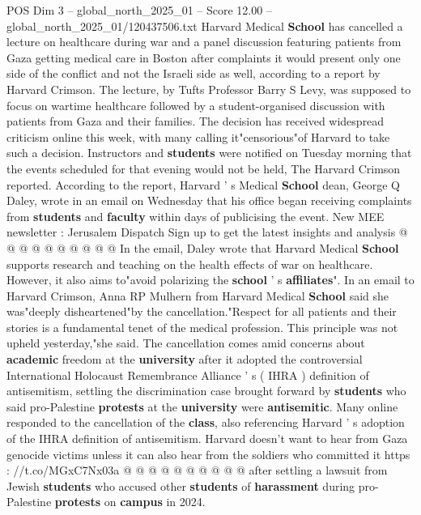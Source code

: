 \begin{textsample}{POS Dim 3 – global\_north\_2025\_01 – Score 12.00 – global\_north\_2025\_01/120437506.txt}  \label{ex:f3_pos_265}
Harvard Medical \textbf{School} has cancelled a lecture on healthcare during war and a panel discussion featuring patients from Gaza getting medical care in Boston after complaints it would present only one side of the conflict and not the Israeli side as well, according to a report by Harvard Crimson.
The lecture, by Tufts Professor Barry S Levy, was supposed to focus on wartime healthcare followed by a student-organised discussion with patients from Gaza and their families.
The decision has received widespread criticism online this week, with many calling it"censorious"of Harvard to take such a decision.
Instructors and \textbf{students} were notified on Tuesday morning that the events scheduled for that evening would not be held, The Harvard Crimson reported.
According to the report, Harvard ' s Medical \textbf{School} dean, George Q Daley, wrote in an email on Wednesday that his office began receiving complaints from \textbf{students} and \textbf{faculty} within days of publicising the event.
New MEE newsletter : Jerusalem Dispatch Sign up to get the latest insights and analysis @ @ @ @ @ @ @ @ @ @ In the email, Daley wrote that Harvard Medical \textbf{School} supports research and teaching on the health effects of war on healthcare.
However, it also aims to"avoid polarizing the \textbf{school} ' s \textbf{affiliates}".
In an email to Harvard Crimson, Anna RP Mulhern from Harvard Medical \textbf{School} said she was"deeply disheartened"by the cancellation."Respect for all patients and their stories is a fundamental tenet of the medical profession.
This principle was not upheld yesterday,"she said.
The cancellation comes amid concerns about \textbf{academic} freedom at the \textbf{university} after it adopted the controversial International Holocaust Remembrance Alliance ' s ( IHRA ) definition of antisemitism, settling the discrimination case brought forward by \textbf{students} who said pro-Palestine \textbf{protests} at the \textbf{university} were \textbf{antisemitic}.
Many online responded to the cancellation of the \textbf{class}, also referencing Harvard ' s adoption of the IHRA definition of antisemitism.
Harvard doesn't want to hear from Gaza genocide victims unless it can also hear from the soldiers who committed it https : //t.co/MGxC7Nx03a @ @ @ @ @ @ @ @ @ @ after settling a lawsuit from Jewish \textbf{students} who accused other \textbf{students} of \textbf{harassment} during pro-Palestine \textbf{protests} on \textbf{campus} in 2024.

\end{textsample}
